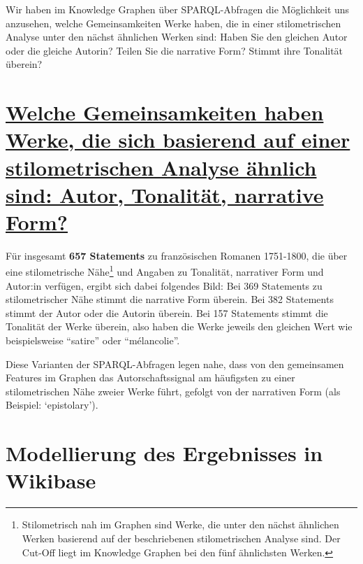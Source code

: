 \documentclass[
  12pt,
  letterpaper,
]{classicthesis}
\begin{document}
Wir haben im Knowledge Graphen über SPARQL-Abfragen die Möglichkeit uns
anzusehen, welche Gemeinsamkeiten Werke haben, die in einer
stilometrischen Analyse unter den nächst ähnlichen Werken sind: Haben
Sie den gleichen Autor oder die gleiche Autorin? Teilen Sie die
narrative Form? Stimmt ihre Tonalität überein?

\section{\texorpdfstring{\href{https://tinyurl.com/24q38l55}{Welche
Gemeinsamkeiten haben Werke, die sich basierend auf einer
stilometrischen Analyse ähnlich sind: Autor, Tonalität, narrative
Form?}}{Welche Gemeinsamkeiten haben Werke, die sich basierend auf einer stilometrischen Analyse ähnlich sind: Autor, Tonalität, narrative Form?}}\label{welche-gemeinsamkeiten-haben-werke-die-sich-basierend-auf-einer-stilometrischen-analyse-uxe4hnlich-sind-autor-tonalituxe4t-narrative-form}

Für insgesamt \textbf{657 Statements} zu französischen Romanen
1751-1800, die über eine stilometrische Nähe\footnote{Stilometrisch nah
  im Graphen sind Werke, die unter den nächst ähnlichen Werken basierend
  auf der beschriebenen stilometrischen Analyse sind. Der Cut-Off liegt
  im Knowledge Graphen bei den fünf ähnlichsten Werken.} und Angaben zu
Tonalität, narrativer Form und Autor:in verfügen, ergibt sich dabei
folgendes Bild: Bei 369 Statements zu stilometrischer Nähe stimmt die
narrative Form überein. Bei 382 Statements stimmt der Autor oder die
Autorin überein. Bei 157 Statements stimmt die Tonalität der Werke
überein, also haben die Werke jeweils den gleichen Wert wie
beispielsweise ``satire'' oder ``mélancolie''.

Diese Varianten der SPARQL-Abfragen legen nahe, dass von den gemeinsamen
Features im Graphen das Autorschaftssignal am häufigsten zu einer
stilometrischen Nähe zweier Werke führt, gefolgt von der narrativen Form
(als Beispiel: `epistolary').

\section{Modellierung des Ergebnisses in
Wikibase}\label{modellierung-des-ergebnisses-in-wikibase}
\end{document}

